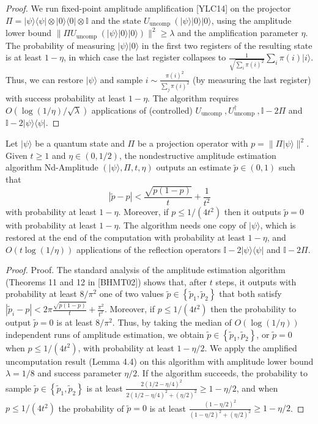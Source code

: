 \begin{proof}
	We run fixed-point amplitude amplification [YLC14] on the projector $\Pi=|\psi\rangle\langle\psi|\otimes| 0\rangle\langle 0| \otimes \mathbb{I}$ and the state $U_{\text {uncomp }}\left(|\psi\rangle|0\rangle|0\rangle\right.$, using the amplitude lower bound $\| \Pi U_{\text {uncomp }}(|\psi\rangle|0\rangle|0\rangle) \|^2 \geq \lambda$ and the amplification parameter $\eta$. The probability of measuring $|\psi\rangle|0\rangle$ in the first two registers of the resulting state is at least $1-\eta$, in which case the last register collapses to $\frac{1}{\sqrt{\sum_i \pi(i)^2}} \sum_i \pi(i)|i\rangle$. Thus, we can restore $|\psi\rangle$ and sample $i \sim \frac{\pi(i)^2}{\sum_j \pi(i)^2}$ (by measuring the last register) with success probability at least $1-\eta$. The algorithm requires $O(\log (1 / \eta) / \sqrt{\lambda})$ applications of (controlled) $U_{\text {uncomp }}, U_{\text {uncomp }}^{\dagger}, \mathbb{I}-2 \Pi$ and $\mathbb{I}-2|\psi\rangle\langle\psi|$.
\end{proof}
\begin{lemma}
	 Let $|\psi\rangle$ be a quantum state and $\Pi$ be a projection operator with $p=\| \Pi|\psi\rangle \|^2$. Given $t \geq 1$ and $\eta \in(0,1 / 2)$, the nondestructive amplitude estimation algorithm Nd-Amplitude $(|\psi\rangle, \Pi, t, \eta)$ outputs an estimate $\widetilde{p} \in(0,1)$ such that
$$
|\widetilde{p}-p|<\frac{\sqrt{p(1-p)}}{t}+\frac{1}{t^2}
$$
with probability at least $1-\eta$. Moreover, if $p \leq 1 /\left(4 t^2\right)$ then it outputs $\widetilde{p}=0$ with probability at least $1-\eta$. The algorithm needs one copy of $|\psi\rangle$, which is restored at the end of the computation with probability at least $1-\eta$, and $O(t \log (1 / \eta))$ applications of the reflection operators $\mathbb{I}-2|\psi\rangle\langle\psi|$ and $\mathbb{I}-2 \Pi$.
\end{lemma}
\begin{proof}
Proof. The standard analysis of the amplitude estimation algorithm (Theorems 11 and 12 in [BHMT02]) shows that, after $t$ steps, it outputs with probability at least $8 / \pi^2$ one of two values $\widetilde{p} \in\left\{\widetilde{p}_1, \widetilde{p}_2\right\}$ that both satisfy $\left|\widetilde{p}_i-p\right|<2 \pi \frac{\sqrt{p(1-p)}}{t}+\frac{\pi^2}{t^2}$. Moreover, if $p \leq 1 /\left(4 t^2\right)$ then the probability to output $\widetilde{p}=0$ is at least $8 / \pi^2$. Thus, by taking the median of $O(\log (1 / \eta))$ independent runs of amplitude estimation, we obtain $\widetilde{p} \in\left\{\widetilde{p}_1, \widetilde{p}_2\right\}$, or $\widetilde{p}=0$ when $p \leq 1 /\left(4 t^2\right)$, with probability at least $1-\eta / 2$. We apply the amplified uncomputation result (Lemma 4.4) on this algorithm with amplitude lower bound $\lambda=1 / 8$ and success parameter $\eta / 2$. If the algorithm succeeds, the probability to sample $\widetilde{p} \in\left\{\widetilde{p}_1, \widetilde{p}_2\right\}$ is at least $\frac{2(1 / 2-\eta / 4)^2}{2(1 / 2-\eta / 4)^2+(\eta / 2)^2} \geq 1-\eta / 2$, and when $p \leq 1 /\left(4 t^2\right)$ the probability of $\widetilde{p}=0$ is at least $\frac{(1-\eta / 2)^2}{(1-\eta / 2)^2+(\eta / 2)^2} \geq 1-\eta / 2$.
\end{proof}
